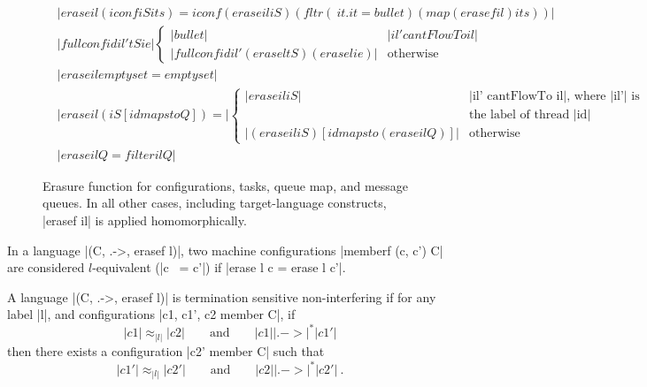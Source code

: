 \begin{figure}
\begin{align*}
  &|erase il (iconf iS its) =
  iconf (erase il iS) (fltr (\ it . it = bullet) (map (erasef il) its))| \\
  &|fullconf id il' tS ie| \begin{cases}
    |bullet| & |il' cantFlowTo il| \\
    |fullconf id il' (erase l tS) (erase l ie)| & \text{otherwise}
  \end{cases} \\
  &|erase il emptyset = emptyset|\\
  &|erase il (iS [id mapsto Q]) =| \begin{cases}
    |erase il iS| & \text{|il' cantFlowTo il|, where |il'| is}\\
    & \text{the label of thread |id|} \\
    |(erase il iS) [id mapsto (erase il Q)]| & \text{otherwise}
  \end{cases} \\
  &|erase il Q = filter il Q|
\end{align*}
\caption{
Erasure function for configurations, tasks, queue map, and message queues.
In all other cases, including target-language constructs, |erasef il| is
applied homomorphically.
\label{fig:erasure}
}
\end{figure}


\begin{definition}[$l$-equivalence]
    In a language |(C, .->, erasef l)|, two machine configurations
    |memberf (c, c') C| are considered $l$-equivalent (|c ~= c'|)
    if |erase l c = erase l c'|.
\end{definition}

\begin{definition}
  A language |(C, .->, erasef l)| is termination
  sensitive non-interfering if for any label |l|, and configurations
  |c1, c1', c2 member C|, if
  \begin{equation} \label{eq:tsni-lhs}
    |c1| \approx_{|l|} |c2|
    \qquad \text{and} \qquad
    |c1| |.->|^* |c1'|
  \end{equation}
  then there exists a configuration |c2' member C| such that
  \begin{equation} \label{eq:tsni-rhs}
    |c1'| \approx_{|l|} |c2'|
     \qquad \text{and} \qquad
    |c2| |.->|^* |c2'|
    \ \text{.}
  \end{equation}
\end{definition}

